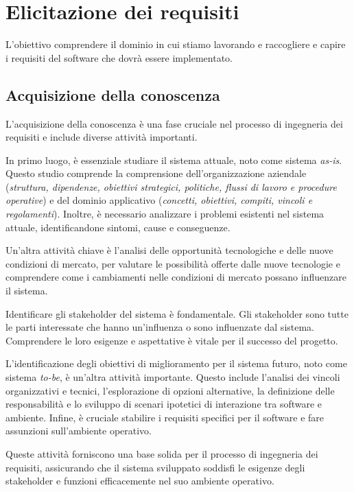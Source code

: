 \chapter{Elicitazione dei requisiti}
L'obiettivo comprendere il dominio in cui stiamo lavorando e 
raccogliere e capire i requisiti del software che dovrà essere
implementato. 
\section{Acquisizione della conoscenza}

L'acquisizione della conoscenza è una fase cruciale nel processo di
ingegneria dei requisiti e include diverse attività importanti.

In primo luogo, è essenziale studiare il sistema attuale, noto come sistema
\textit{as-is}. Questo studio comprende la comprensione dell'organizzazione
aziendale (\textit{struttura, dipendenze, obiettivi strategici, politiche, flussi di
lavoro e procedure operative}) e del dominio applicativo (\textit{concetti, obiettivi,
compiti, vincoli e regolamenti}). Inoltre, è necessario analizzare i problemi
esistenti nel sistema attuale, identificandone sintomi, cause e conseguenze.

Un'altra attività chiave è l'analisi delle opportunità tecnologiche e delle
nuove condizioni di mercato, per valutare le possibilità offerte dalle nuove
tecnologie e comprendere come i cambiamenti nelle condizioni di mercato possano
influenzare il sistema.

Identificare gli stakeholder del sistema è fondamentale. Gli stakeholder sono
tutte le parti interessate che hanno un'influenza o sono influenzate dal sistema.
Comprendere le loro esigenze e aspettative è vitale per il successo del progetto.

L'identificazione degli obiettivi di miglioramento per il sistema futuro, noto
come sistema \textit{to-be}, è un'altra attività importante. Questo include
l'analisi dei vincoli organizzativi e tecnici, l'esplorazione di opzioni
alternative, la definizione delle responsabilità e lo sviluppo di scenari
ipotetici di interazione tra software e ambiente. Infine, è cruciale stabilire
i requisiti specifici per il software e fare assunzioni sull'ambiente operativo.

Queste attività forniscono una base solida per il processo di ingegneria
dei requisiti, assicurando che il sistema sviluppato soddisfi le esigenze
degli stakeholder e funzioni efficacemente nel suo ambiente operativo.

